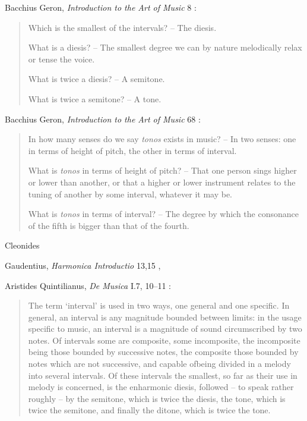 \documentclass{amsart}
\theoremstyle{definition}
\begin{document}
Bacchius Geron, {\em Introduction to the Art of Music} 8 \cite[pp.~273--274]{bacchius}:

\begin{quote}
Which is the smallest of the intervals? -- The diesis.

What is a diesis? -- The smallest degree we can by nature melodically relax or tense
 the voice.
 
What is twice a diesis? -- A semitone.
  
What is twice a semitone? -- A tone.
\end{quote}

Bacchius Geron, {\em Introduction to the Art of Music} 68 \cite[p.~287]{bacchius}:

\begin{quote}
 In how many senses do we say {\em tonos} exists in music? -- In two senses: one in terms of height of pitch, the other in terms
 of interval.
 
 What is {\em tonos} in terms of height of pitch?
 -- That one person sings higher or lower than another, or that a
 higher or lower instrument relates to the tuning of another by
 some interval, whatever it may be.
 
 What is {\em tonos} in terms of interval?
 -- The degree by which the consonance of the fifth is bigger than
 that of the fourth.
\end{quote}

Cleonides \cite{strunk}

Gaudentius, {\em Harmonica Introductio} 13,15 \cite{strunk}, \cite[p.~327]{MSG}

Aristides Quintilianus, {\em De Musica} I.7, 10--11 \cite[p.~410]{barker}:

\begin{quote}
The term `interval' is used in two ways, one general and one
specific. In general, an interval is any magnitude bounded between limits: in
the usage specific to music, an interval is a magnitude of sound circumscribed
by two notes. Of intervals some are composite, some incomposite, the
incomposite being those bounded by successive notes, the composite those
bounded by notes which are not successive, and capable ofbeing divided in a
melody into several intervals. Of these intervals the smallest, so far as their
use in melody is concerned, is the enharmonic diesis, followed -- to speak
rather roughly -- by the semitone, which is twice the diesis, the tone, which is
twice the semitone, and finally the ditone, which is twice the tone.
\end{quote}
\end{document}
